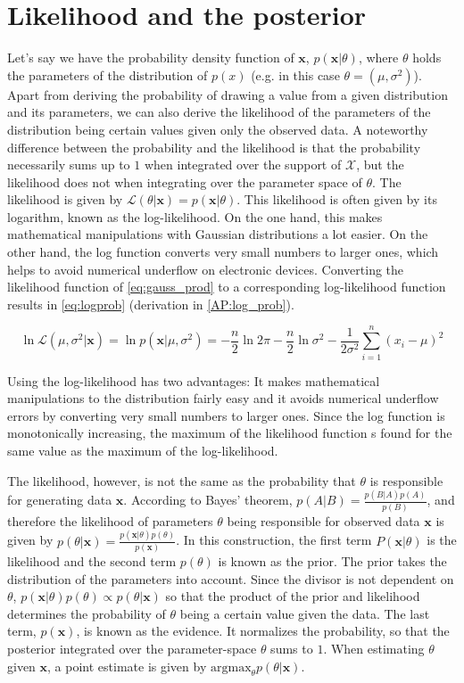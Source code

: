\section{Likelihood and the posterior}
 Let's say we have the probability density function of $\bm{x}$, $p(\bm{x}|\theta)$, where $\theta$ holds the parameters of the distribution of $p(x)$ (e.g. in this case $\theta = (\mu, \sigma^2)$). Apart from deriving the probability of drawing a value from a given distribution and its parameters, we can also derive the likelihood of the parameters of the distribution being certain values given only the observed data. A noteworthy difference between the probability and the likelihood is that the probability necessarily sums up to $1$ when integrated over the support of $\mathcal{X}$, but the likelihood does not when integrating over the parameter space of $\theta$. The likelihood is given by $\mathcal{L}(\theta|\bm{x}) = p(\bm{x}|\theta)$. This likelihood is often given by its logarithm, known as the log-likelihood. On the one hand, this makes mathematical manipulations with Gaussian distributions a lot easier. On the other hand, the log function converts very small numbers to larger ones, which helps to avoid numerical underflow on electronic devices. Converting the likelihood function of \ref{eq:gauss_prod} to a corresponding log-likelihood function results in \ref{eq:logprob} (derivation in \ref{AP:log_prob}).

\begin{equation}\label{eq:logprob}
    \ln \mathcal{L}(\mu, \sigma^2 | \bm{x}) = \ln p(\textbf{x} | \mu, \sigma^2) = -\frac{n}{2} \ln 2 \pi -\frac{n}{2} \ln \sigma ^2 - \frac{1}{2\sigma ^2} \sum_{i=1}^{n} (x_i - \mu)^2
\end{equation}

Using the log-likelihood has two advantages: It makes mathematical manipulations to the distribution fairly easy and it avoids numerical underflow errors by converting very small numbers to larger ones. Since the log function is monotonically increasing, the maximum of the likelihood function s found for the same value as the maximum of the log-likelihood.

 The likelihood, however, is not the same as the probability that $\theta$ is responsible for generating data $\bm{x}$. According to Bayes' theorem, $p(A|B) = \frac{p(B|A) p(A)}{p(B)}$, and therefore the likelihood of parameters $\theta$ being responsible for observed data $\bm{x}$ is given by $p(\theta|\bm{x}) = \frac{p(\bm{x}|\theta) p(\theta)}{p(\bm{x})}$. In this construction, the first term $P(\bm{x}|\theta)$ is the likelihood and the second term $p(\theta)$ is known as the prior. The prior takes the distribution of the parameters into account. Since the divisor is not dependent on $\theta$, $p(\bm{x}|\theta) p(\theta) \propto p(\theta|\bm{x})$ so that the product of the prior and likelihood determines the probability of $\theta$ being a certain value given the data. The last term, $p(\bm{x})$, is known as the evidence. It normalizes the probability, so that the posterior integrated over the parameter-space $\theta$ sums to $1$. When estimating $\theta$ given $\bm{x}$, a point estimate is given by $\text{argmax}_\theta p(\theta|\bm{x})$.
 
